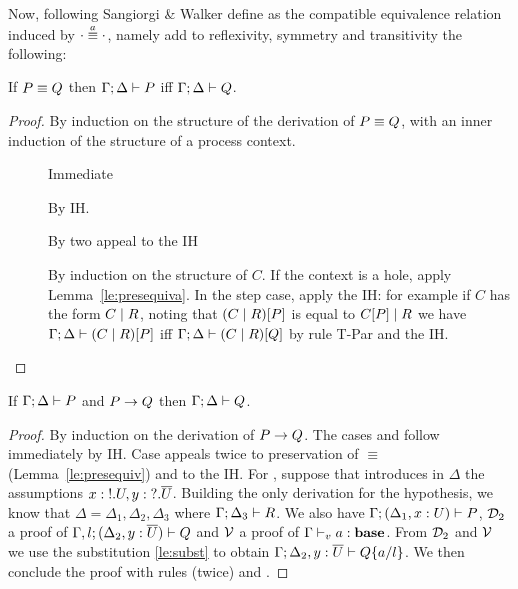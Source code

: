 Now, following Sangiorgi \& Walker define as the compatible equivalence relation induced by $\sconga\cdot\cdot$, namely add to reflexivity, symmetry  and transitivity the following:
 \begin{mathpar}
 \end{mathpar}

\begin{lemma}
  \label{le:presequiv}
    If \( \scong{P}{Q} \) then \( \types{\Gamma;\Delta}{P} \)  iff \( \types{\Gamma;\Delta}{Q} \).
\end{lemma}
\begin{proof}
  By induction on the structure of the derivation of \( \scong{P}{Q} \), with an inner induction of the structure of a process context.
  \begin{description}
  \item[] Immediate
      \item[] By IH.
      \item[]  By two appeal to the IH
          \item[] By induction on the structure of $C$. If the context is a hole, apply Lemma~\ref{le:presequiva}. In the step case, apply the IH: for example if $C$ has the form ${\Ppar C R}$, noting that ${\PBpar C R}[P]$ is equal to ${\Ppar {C[P]} R}$ we have \( \types{\Gamma;\Delta}{{\PBpar C R}[P]} \)  iff \( \types{\Gamma;\Delta}{{\PBpar C R}[Q]} \) by rule T-Par and the IH.
  \end{description}
\end{proof}

\begin{theorem}
  If \( \types{\Gamma;\Delta}{P} \) and \( \reduces{P}{Q} \) then \( \types{\Gamma;\Delta}{Q} \).
\end{theorem}
\begin{proof}
  By induction on the derivation of $\reduces{P}{Q}$. The cases  and  follow immediately by IH. Case  appeals twice to
  preservation of $\equiv$ (Lemma~\ref{le:presequiv}) and to the
  IH. For , suppose that  introduces in $\Delta$ the
  assumptions $\Cadd{\hastype{x}{\Tout{U}}}{\hastype{y}{\Tin{\dual{U}}}}$.  Building the only derivation for the
  hypothesis, we know that $\Delta = \Delta_1, \Delta_2, \Delta_3$
  where $\types{\Gamma;\Delta_3}{R}$. We also have
  $\types{\Gamma;(\Cadd{\Delta_1}{\hastype{x}{U}})}{P}$, ${\cal D}_{2} $ a proof of
  $\types{\Gamma,l;(\Cadd{\Delta_2}{\hastype{y}{\dual{U}}})}{Q}$ and $\cal V $ a proof of
  $\typev{\Gamma}{\hastype{a}{\Tbase}}$.  From ${\cal D}_{2}$ and $\cal V$ we use the
  substitution \cref{le:subst} to obtain $\types{\Gamma;\Cadd{\Delta_2}{\hastype{y}{\dual{U}}}}{\subst{Q}{a}{l}}$. We then conclude the proof with rules  (twice) and .
\end{proof}

